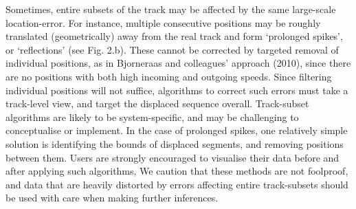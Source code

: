 \documentclass[10pt,paper=a4,headings=standardclasses
]{scrartcl}
\begin{document}
Sometimes, entire subsets of the track may be affected by the same large-scale location-error.
For instance, multiple consecutive positions may be roughly translated (geometrically) away from the real track and form `prolonged spikes', or `reflections' (see Fig. 2.b).
These cannot be corrected by targeted removal of individual positions, as in Bjorneraas and colleagues' approach (2010), since there are no positions with both high incoming and outgoing speeds.
Since filtering individual positions will not suffice, algorithms to correct such errors must take a track-level view, and target the displaced sequence overall.
Track-subset algorithms are likely to be system-specific, and may be challenging to conceptualise or implement.
In the case of prolonged spikes, one relatively simple solution is identifying the bounds of displaced segments, and removing positions between them.
Users are strongly encouraged to visualise their data before and after applying such algorithms, 
We caution that these methods are not foolproof, and data that are heavily distorted by errors affecting entire track-subsets should be used with care when making further inferences.

\end{document}
